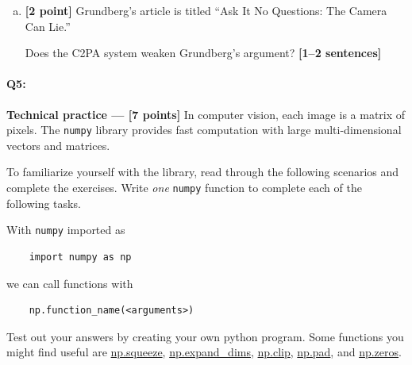 \documentclass[11pt]{article}
\begin{document}
\begin{enumerate}[(a)]
\begin{tcolorbox}[colback=white!5!white,colframe=green!75!black,breakable]
{{        
        }}
    \end{tcolorbox}

\item \textbf{[2 point]}
    Grundberg's article is titled ``Ask It No Questions: The Camera Can Lie.''
    \begin{tcolorbox}[colback=orange!5!white,colframe=orange!75!black]
        Does the C2PA system weaken Grundberg's argument? \textbf{[1--2 sentences]}
    \end{tcolorbox}
\end{enumerate}

\pagebreak
\paragraph{Q5:} \textbf{Technical practice --- [7 points]}  In computer vision, each image is a matrix of pixels. The \texttt{numpy} library provides fast computation with large multi-dimensional vectors and matrices. 

To familiarize yourself with the library, read through the following scenarios and complete the exercises. Write \emph{one} \texttt{numpy} function to complete each of the following tasks.

With \texttt{numpy} imported as
\begin{verbatim}
    import numpy as np
\end{verbatim}
we can call functions with 
\begin{verbatim}
    np.function_name(<arguments>)
\end{verbatim}
Test out your answers by creating your own python program. Some functions you might find useful are \href{https://numpy.org/doc/stable/reference/generated/numpy.squeeze.html}{np.squeeze}, \href{https://numpy.org/doc/stable/reference/generated/numpy.expand_dims.html}{np.expand\_dims}, \href{https://numpy.org/doc/stable/reference/generated/numpy.clip.html}{np.clip}, \href{https://numpy.org/doc/stable/reference/generated/numpy.pad.html}{np.pad}, and \href{https://numpy.org/doc/stable/reference/generated/numpy.zeros.html}{np.zeros}.
\end{document}
